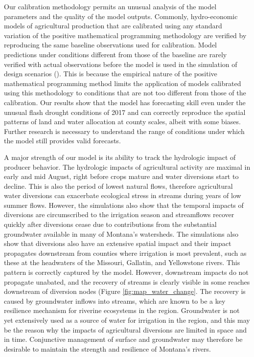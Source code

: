  Our calibration methodology permits an unusual analysis of the model parameters and the quality of the model outputs. Commonly, hydro-economic models of agricultural production that are calibrated using any standard variation of the positive mathematical programming methodology are verified by reproducing the same baseline observations used for calibration. Model predictions under conditions different from those of the baseline are rarely verified with actual observations before the model is used in the simulation of design scenarios (\citep{Graveline2016}). This is because the empirical nature of the positive mathematical programming method limits the application of models calibrated using this methodology to conditions that are not too different from those of the calibration. Our results show that the model has forecasting skill even under the unusual flash drought conditions of 2017 and can correctly reproduce the spatial patterns of land and water allocation at county scales, albeit with some biases. Further research is necessary to understand the range of conditions under which the model still provides valid forecasts. 

 A major strength of our model is its ability to track the hydrologic impact of producer behavior. The hydrologic impacts of agricultural activity are maximal in early and mid August, right before crops mature and water diversions start to decline. This is also the period of lowest natural flows, therefore agricultural water diversions can exacerbate ecological stress in streams during years of low summer flows. However, the simulations also show that the temporal impacts of diversions are circumscribed to the irrigation season and streamflows recover quickly after diversions cease due to contributions from the substantial groundwater available in many of Montana's watersheds. The simulations also show that diversions also have an extensive spatial impact and their impact propagates downstream from counties where irrigation is most prevalent, such as these at the headwaters of the Missouri, Gallatin, and Yellowstone rivers. This pattern is correctly captured by the model. However, downstream impacts do not propagate unabated, and the recovery of streams is clearly visible in some reaches downstream of diversion nodes (Figure \ref{fig:map_water_change}. The recovery is caused by groundwater inflows into streams, which are known to be a key resilience mechanism for riverine ecosystems in the region. Groundwater is not yet extensively used as a source of water for irrigation in the region, and this may be the reason why the impacts of agricultural diversions are limited in space and in time. Conjunctive management of surface and groundwater may therefore be desirable to maintain the strength and resilience of Montana's rivers. 
 
